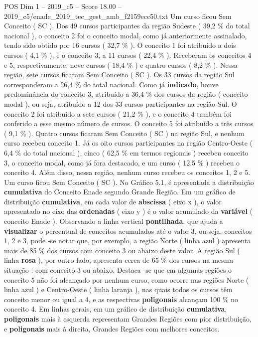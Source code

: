 \begin{textsample}{POS Dim 1 – 2019\_c5 – Score 18.00 – 2019\_c5/enade\_2019\_tec\_gest\_amb\_f2159ecc50.txt}
Um curso ficou Sem Conceito ( SC ).
Dos 49 cursos participantes da região Sudeste ( 39,2 \% do total nacional ), o conceito 2 foi o conceito modal, como já anteriormente assinalado, tendo sido obtido por 16 cursos ( 32,7 \% ).
O conceito 1 foi atribuído a dois cursos ( 4,1 \% ), e o conceito 3, a 11 cursos ( 22,4 \% ).
Receberam os conceitos 4 e 5, respectivamente, nove cursos ( 18,4 \% ) e quatro cursos ( 8,2 \% ).
Nessa região, sete cursos ficaram Sem Conceito ( SC ).
Os 33 cursos da região Sul corresponderam a 26,4 \% do total nacional.
Como já \textbf{indicado}, houve predominância do conceito 3, atribuído a 36,4 \% dos cursos da região ( conceito modal ), ou seja, atribuído a 12 dos 33 cursos participantes na região Sul.
O conceito 2 foi atribuído a sete cursos ( 21,2 \% ), e o conceito 4 também foi conferido a esse mesmo número de cursos.
O conceito 5 foi atribuído a três cursos ( 9,1 \% ).
Quatro cursos ficaram Sem Conceito ( SC ) na região Sul, e nenhum curso recebeu conceito 1.
Já os oito cursos participantes na região Centro-Oeste ( 6,4 \% do total nacional ), cinco ( 62,5 \% em termos regionais ) recebeu conceito 3, o conceito modal, como já fora destacado, e um curso ( 12,5 \% ) recebeu o conceito 4.
Além disso, nessa região, nenhum curso recebeu os conceitos 1, 2 e 5.
Um curso ficou Sem Conceito ( SC ).
No Gráfico 5.1, é apresentada a distribuição \textbf{cumulativa} do Conceito Enade segundo Grande Região.
Em um gráfico de distribuição \textbf{cumulativa}, em cada valor de \textbf{abscissa} ( eixo x ), o valor apresentado no eixo das \textbf{ordenadas} ( eixo y ) é o valor acumulado da \textbf{variável} ( conceito Enade ).
Observando a linha vertical \textbf{pontilhada}, que ajuda a \textbf{visualizar} o percentual de conceitos acumulados até o valor 3, ou seja, conceitos 1, 2 e 3, pode -se notar que, por exemplo, a região Norte ( linha azul ) apresenta mais de 85 \% dos cursos com conceito 3 ou abaixo deste valor.
A região Sul ( linha \textbf{rosa} ), por outro lado, apresenta cerca de 65 \% dos cursos na mesma situação : com conceito 3 ou abaixo.
Destaca -se que em algumas regiões o conceito 5 não foi alcançado por nenhum curso, como ocorre nas regiões Norte ( linha azul ) e Centro-Oeste ( linha laranja ), nas quais todos os cursos têm conceito menor ou igual a 4, e as respectivas \textbf{poligonais} alcançam 100 \% no conceito 4.
Em linhas gerais, em um gráfico de distribuição \textbf{cumulativa}, \textbf{poligonais} mais à esquerda representam Grandes Regiões com pior distribuição, e \textbf{poligonais} mais à direita, Grandes Regiões com melhores conceitos.

\end{textsample}
